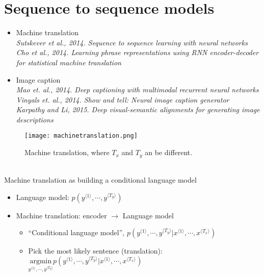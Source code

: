 \section{Sequence to sequence models}
\begin{itemize}
\item
Machine translation\\
\textit{Sutskever et al., 2014. Sequence to sequence learning with neural networks}\\
\textit{Cho et al., 2014. Learning phrase representations using RNN encoder-decoder for statistical machine translation}
\item
Image caption\\
\textit{Mao et. al., 2014. Deep captioning with multimodal recurrent neural networks}\\
\textit{Vinyals et. al., 2014. Show and tell: Neural image caption generator}\\
\textit{Karpathy and Li, 2015. Deep visual-semantic alignments for generating image descriptions}
\end{itemize}
\begin{figure}[h]
    \centering
    \texttt{[image: machinetranslation.png]}
    \caption{Machine translation, where $T_x$ and $T_y$ an be different.}
    \label{fig:machinetranslation}
\end{figure}
~\\
Machine translation as building a conditional language model
\begin{itemize}
\item
Language model: $\displaystyle p(y^{\langle1\rangle}, \cdots, y^{\langle T_y \rangle})$
\item
    Machine translation: encoder $\rightarrow$ Language model
    \begin{itemize}
    \item
    ``Conditional language model'', $\displaystyle p(y^{\langle 1 \rangle}, \cdots, y^{\langle T_y\rangle} | x^{\langle 1 \rangle}, \cdots, x^{\langle T_x \rangle})$
    \item
    Pick the most likely sentence (translation):\\
    $\displaystyle \underset{y^{\langle 1 \rangle}, \cdots, y^{\langle T_y\rangle}}{\mathrm{argmin}} p(y^{\langle 1 \rangle}, \cdots, y^{\langle T_y\rangle} | x^{\langle 1 \rangle}, \cdots, x^{\langle T_x \rangle})$
    \end{itemize}
\end{itemize}

%
